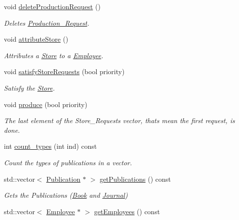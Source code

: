 \begin{DoxyCompactItemize}
void \hyperlink{class_headquarters_a943b8cc7b3c1c8c8a126065897512b91}{delete\+Production\+Request} ()
\begin{DoxyCompactList}\small\item\em Deletes \hyperlink{class_production___request}{Production\+\_\+\+Request}. \end{DoxyCompactList}\item 
void \hyperlink{class_headquarters_ad162fb3833c24833a0ac83b50f3df91b}{attribute\+Store} ()
\begin{DoxyCompactList}\small\item\em Attributes a \hyperlink{class_store}{Store} to a \hyperlink{class_employee}{Employee}. \end{DoxyCompactList}\item 
void \hyperlink{class_headquarters_a41ad767a1dac88d048c8584a81fbabf2}{satisfy\+Store\+Requests} (bool priority)
\begin{DoxyCompactList}\small\item\em Satisfy the \hyperlink{class_store}{Store}. \end{DoxyCompactList}\item 
void \hyperlink{class_headquarters_a92e2ecf8f496e2681a71a13b91d0da7d}{produce} (bool priority)
\begin{DoxyCompactList}\small\item\em The last element of the Store\+\_\+\+Requests vector, that\textquotesingle{}s mean the first request, is done. \end{DoxyCompactList}\item 
int \hyperlink{class_headquarters_a6951a0254016c43b0d54bd17195d711d}{count\+\_\+types} (int ind) const
\begin{DoxyCompactList}\small\item\em Count the types of publications in a vector. \end{DoxyCompactList}\item 
std\+::vector$<$ \hyperlink{class_publication}{Publication} $\ast$ $>$ \hyperlink{class_headquarters_a71a68cac0db5c9aa33b548f4b696b9bc}{get\+Publications} () const
\begin{DoxyCompactList}\small\item\em Gets the Publications (\hyperlink{class_book}{Book} and \hyperlink{class_journal}{Journal}) \end{DoxyCompactList}\item 
std\+::vector$<$ \hyperlink{class_employee}{Employee} $\ast$ $>$ \hyperlink{class_headquarters_a0d5357a865f5ccdf194404b97f04816a}{get\+Employees} () const

\end{DoxyCompactItemize}
